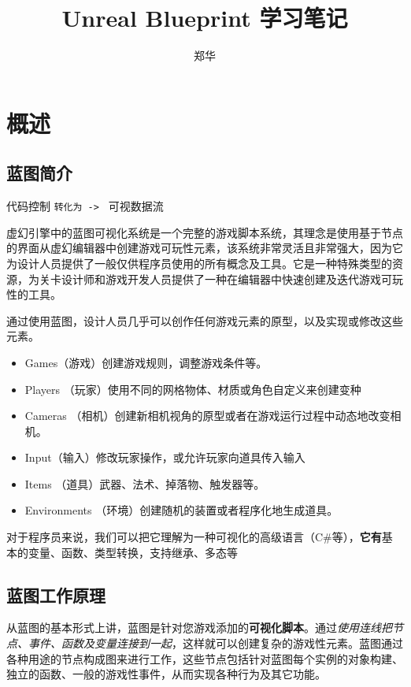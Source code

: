 \documentclass[UTF8,a4paper,12pt]{ctexbook}
\author{\kaishu 郑华}
\title{Unreal Blueprint 学习笔记}
\begin{document}
 	\maketitle
 	\tableofcontents


\chapter{概述}
	\section{蓝图简介}
		代码控制 \verb|转化为 -> | 可视数据流
	
		虚幻引擎中的蓝图可视化系统是一个完整的游戏脚本系统，其理念是使用基于节点的界面从虚幻编辑器中创建游戏可玩性元素，该系统非常灵活且非常强大，因为它为设计人员提供了一般仅供程序员使用的所有概念及工具。它是一种特殊类型的资源，为关卡设计师和游戏开发人员提供了一种在编辑器中快速创建及迭代游戏可玩性的工具。
		
		通过使用蓝图，设计人员几乎可以创作任何游戏元素的原型，以及实现或修改这些元素。
			\begin{itemize}
				\item Games（游戏）创建游戏规则，调整游戏条件等。
				\item Players （玩家）使用不同的网格物体、材质或角色自定义来创建变种
				\item Cameras （相机）创建新相机视角的原型或者在游戏运行过程中动态地改变相机。
				\item Input（输入）修改玩家操作，或允许玩家向道具传入输入
				\item Items （道具）武器、法术、掉落物、触发器等。
				\item Environments （环境）创建随机的装置或者程序化地生成道具。
			\end{itemize}	
			
		对于程序员来说，我们可以把它理解为一种可视化的高级语言（C\#等），\textbf{它有}基本的变量、函数、类型转换，支持继承、多态等

	\section{蓝图工作原理}
		从蓝图的基本形式上讲，蓝图是针对您游戏添加的\textbf{可视化脚本}。通过\textit{使用连线把节点、事件、函数及变量连接到一起}，这样就可以创建复杂的游戏性元素。蓝图通过各种用途的节点构成图来进行工作，这些节点包括针对蓝图每个实例的对象构建、独立的函数、一般的游戏性事件，从而实现各种行为及其它功能。
	
\end{document}
